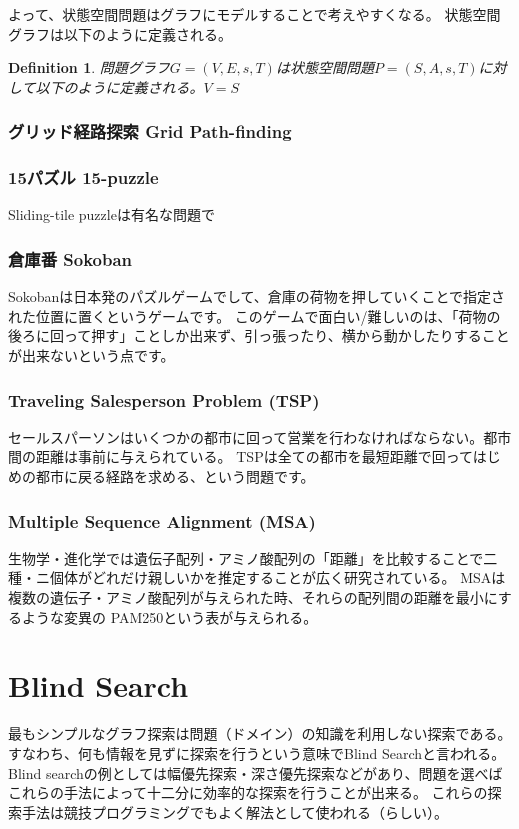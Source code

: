 \documentclass{book}
\newtheorem{definition}{Definition}
\begin{document}
よって、状態空間問題はグラフにモデルすることで考えやすくなる。
状態空間グラフは以下のように定義される。

\begin{definition}
問題グラフ$G = (V, E, s, T)$は状態空間問題$P = (S, A, s, T)$に対して以下のように定義される。$V = S$
\end{definition}




\subsection{グリッド経路探索 Grid Path-finding}


\subsection{15パズル 15-puzzle}

Sliding-tile puzzleは有名な問題で

\subsection{倉庫番 Sokoban}
Sokobanは日本発のパズルゲームでして、倉庫の荷物を押していくことで指定された位置に置くというゲームです。
このゲームで面白い/難しいのは、「荷物の後ろに回って押す」ことしか出来ず、引っ張ったり、横から動かしたりすることが出来ないという点です。

\subsection{Traveling Salesperson Problem (TSP)}

セールスパーソンはいくつかの都市に回って営業を行わなければならない。都市間の距離は事前に与えられている。
TSPは全ての都市を最短距離で回ってはじめの都市に戻る経路を求める、という問題です。

\subsection{Multiple Sequence Alignment (MSA)}

生物学・進化学では遺伝子配列・アミノ酸配列の「距離」を比較することで二種・ニ個体がどれだけ親しいかを推定することが広く研究されている。
MSAは複数の遺伝子・アミノ酸配列が与えられた時、それらの配列間の距離を最小にするような変異の
PAM250という表が与えられる。

\chapter{Blind Search}
\label{ch:blind-search}
最もシンプルなグラフ探索は問題（ドメイン）の知識を利用しない探索である。
すなわち、何も情報を見ずに探索を行うという意味でBlind Searchと言われる。
Blind searchの例としては幅優先探索・深さ優先探索などがあり、問題を選べばこれらの手法によって十二分に効率的な探索を行うことが出来る。
これらの探索手法は競技プログラミングでもよく解法として使われる（らしい）。
\end{document}
